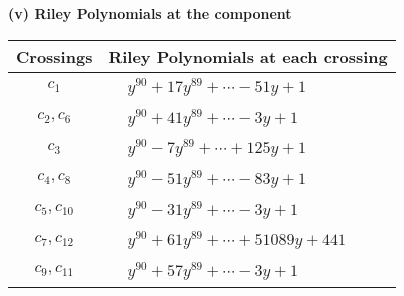 \documentclass[1p]{elsarticle_modified}
\theoremstyle{definition}
\begin{document}
\newpage\renewcommand{\arraystretch}{1}
\flushleft \textbf{(v) Riley Polynomials at the component}\newline \\
\begin{tabular}{m{50pt}|m{274pt}}
Crossings & \hspace{64pt}Riley Polynomials at each crossing \\
\hline $$\begin{aligned}c_{1}\end{aligned}$$&$\begin{aligned}
&y^{90}+17 y^{89}+\cdots-51 y+1
\end{aligned}$\\
\hline $$\begin{aligned}c_{2},c_{6}\end{aligned}$$&$\begin{aligned}
&y^{90}+41 y^{89}+\cdots-3 y+1
\end{aligned}$\\
\hline $$\begin{aligned}c_{3}\end{aligned}$$&$\begin{aligned}
&y^{90}-7 y^{89}+\cdots+125 y+1
\end{aligned}$\\
\hline $$\begin{aligned}c_{4},c_{8}\end{aligned}$$&$\begin{aligned}
&y^{90}-51 y^{89}+\cdots-83 y+1
\end{aligned}$\\
\hline $$\begin{aligned}c_{5},c_{10}\end{aligned}$$&$\begin{aligned}
&y^{90}-31 y^{89}+\cdots-3 y+1
\end{aligned}$\\
\hline $$\begin{aligned}c_{7},c_{12}\end{aligned}$$&$\begin{aligned}
&y^{90}+61 y^{89}+\cdots+51089 y+441
\end{aligned}$\\
\hline $$\begin{aligned}c_{9},c_{11}\end{aligned}$$&$\begin{aligned}
&y^{90}+57 y^{89}+\cdots-3 y+1
\end{aligned}$\\
\hline
\end{tabular}\\~\\
\end{document}
